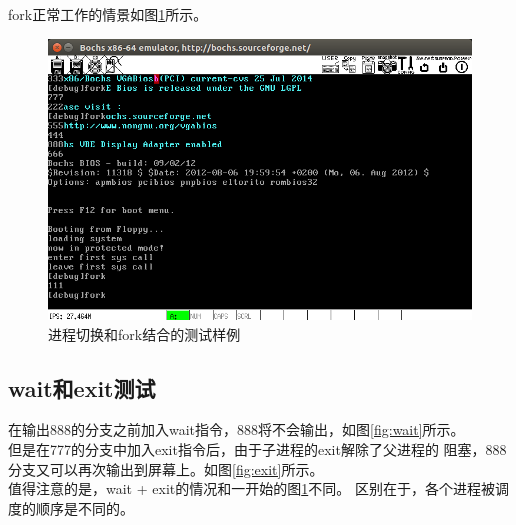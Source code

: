 \documentclass[a4paper]{article}
\begin{document}
    fork正常工作的情景如图\ref{fig:ts_n_fork}所示。
    \begin{figure}
        \begin{center}
        \includegraphics[scale=0.8]{./assets/pm-ex7-taskswitch-and-fork.png}
        \caption{进程切换和fork结合的测试样例\label{fig:ts_n_fork}} 
        \end{center} 
    \end{figure} 
    \subsection{wait和exit测试}
    在输出888的分支之前加入wait指令，888将不会输出，如图\ref{fig:wait}所示。\\

    但是在777的分支中加入exit指令后，由于子进程的exit解除了父进程的
    阻塞，888分支又可以再次输出到屏幕上。如图\ref{fig:exit}所示。\\ 

    值得注意的是，wait + exit的情况和一开始的图\ref{fig:ts_n_fork}不同。
    区别在于，各个进程被调度的顺序是不同的。\\
    
\end{document}
